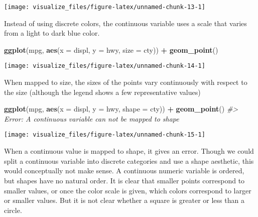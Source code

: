 \documentclass[]{book}
\newenvironment{Shaded}{\begin{snugshade}}{\end{snugshade}}
\newcommand{\CommentTok}[1]{\textcolor[rgb]{0.56,0.35,0.01}{\textit{#1}}}
\newcommand{\DataTypeTok}[1]{\textcolor[rgb]{0.13,0.29,0.53}{#1}}
\newcommand{\KeywordTok}[1]{\textcolor[rgb]{0.13,0.29,0.53}{\textbf{#1}}}
\newcommand{\NormalTok}[1]{#1}
\newcommand{\OperatorTok}[1]{\textcolor[rgb]{0.81,0.36,0.00}{\textbf{#1}}}
\newcommand{\StringTok}[1]{\textcolor[rgb]{0.31,0.60,0.02}{#1}}
\theoremstyle{plain}
\theoremstyle{remark}
\theoremstyle{definition}
\theoremstyle{definition}
\theoremstyle{definition}
\theoremstyle{remark}
\begin{document}
\begin{center}\texttt{[image: visualize\_files/figure-latex/unnamed-chunk-13-1]} \end{center}

Instead of using discrete colors, the continuous variable uses a scale
that varies from a light to dark blue color.

\begin{Shaded}
\begin{Highlighting}[]
\KeywordTok{ggplot}\NormalTok{(mpg, }\KeywordTok{aes}\NormalTok{(}\DataTypeTok{x =}\NormalTok{ displ, }\DataTypeTok{y =}\NormalTok{ hwy, }\DataTypeTok{size =}\NormalTok{ cty)) }\OperatorTok{+}
\StringTok{  }\KeywordTok{geom_point}\NormalTok{()}
\end{Highlighting}
\end{Shaded}

\begin{center}\texttt{[image: visualize\_files/figure-latex/unnamed-chunk-14-1]} \end{center}

When mapped to size, the sizes of the points vary continuously with
respect to the size (although the legend shows a few representative
values)

\begin{Shaded}
\begin{Highlighting}[]
\KeywordTok{ggplot}\NormalTok{(mpg, }\KeywordTok{aes}\NormalTok{(}\DataTypeTok{x =}\NormalTok{ displ, }\DataTypeTok{y =}\NormalTok{ hwy, }\DataTypeTok{shape =}\NormalTok{ cty)) }\OperatorTok{+}
\StringTok{  }\KeywordTok{geom_point}\NormalTok{()}
\CommentTok{#> Error: A continuous variable can not be mapped to shape}
\end{Highlighting}
\end{Shaded}

\begin{center}\texttt{[image: visualize\_files/figure-latex/unnamed-chunk-15-1]} \end{center}

When a continuous value is mapped to shape, it gives an error. Though we
could split a continuous variable into discrete categories and use a
shape aesthetic, this would conceptually not make sense. A continuous
numeric variable is ordered, but shapes have no natural order. It is
clear that smaller points correspond to smaller values, or once the
color scale is given, which colors correspond to larger or smaller
values. But it is not clear whether a square is greater or less than a
circle.
\end{document}
